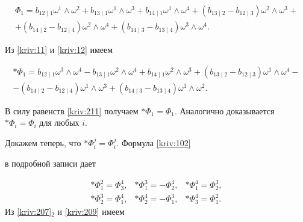 \begin{multline*}


\Phi _{1}=b_{12\mid 1}\omega ^{1}\wedge \omega ^{2}+b_{13\mid 1}\omega

^{1}\wedge \omega ^{3}+b_{14\mid 1}\omega ^{1}\wedge \omega ^{4}+\left(

b_{13\mid 2}-b_{12\mid 3}\right) \omega ^{2}\wedge \omega ^{3}+ \\ 

+\left( b_{14\mid 2}-b_{12\mid 4}\right) \omega ^{2}\wedge \omega

^{4}+\left( b_{14\mid 3}-b_{13\mid 4}\right) \omega ^{3}\wedge \omega ^{4}.


\end{multline*}

Из \eqref{kriv:11} и \eqref{kriv:12} имеем

\begin{multline*}


\ast \Phi _{1}=b_{12\mid 1}\omega ^{3}\wedge \omega ^{4}-b_{13\mid 1}\omega

^{2}\wedge \omega ^{4}+b_{14\mid 1}\omega ^{2}\wedge \omega ^{3}+\left(

b_{13\mid 2}-b_{12\mid 3}\right) \omega ^{1}\wedge \omega ^{4}- \\ 

-\left( b_{14\mid 2}-b_{12\mid 4}\right) \omega ^{1}\wedge \omega

^{3}+\left( b_{14\mid 3}-b_{13\mid 4}\right) \omega ^{1}\wedge \omega ^{2}.


\end{multline*}

В силу равенств \eqref{kriv:211} получаем $\ast \Phi _{1}=\Phi _{1}.$ Аналогично доказывается $\ast \Phi

_{i}=\Phi _{i}$ для любых $i. $



Докажем теперь, что $\ast \Phi _{i}^{j}=\Phi

_{i}^{j}.$ Формула \eqref{kriv:102} 

в подробной записи дает

\begin{equation}

\begin{array}{lll}

\ast \Phi _{1}^{2}=\Phi _{3}^{4}, & \ast \Phi _{1}^{3}=-\Phi _{2}^{4}, & \ast \Phi _{1}^{4}=\Phi _{2}^{3},\\ 

\ast \Phi _{2}^{3}=\Phi _{1}^{4}, & \ast \Phi _{2}^{4}=-\Phi _{1}^{3}, & \ast \Phi _{3}^{4}=\Phi _{1}^{2}.  

\end{array}

\label{kriv:214}

\end{equation}Из \eqref{kriv:207}$_{2}$ и \eqref{kriv:209} имеем

